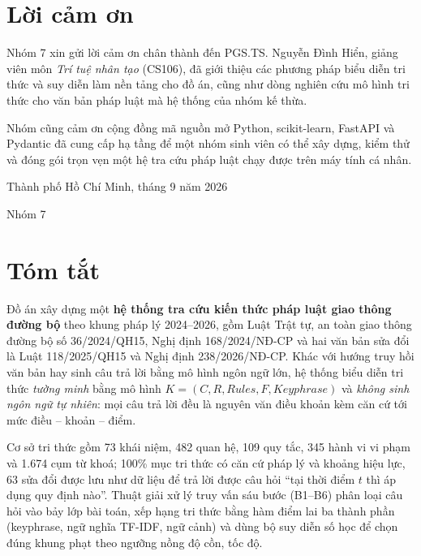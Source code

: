 
\section*{Lời cảm ơn}

Nhóm 7 xin gửi lời cảm ơn chân thành đến PGS.TS. Nguyễn Đình Hiển, giảng viên môn
\emph{Trí tuệ nhân tạo} (CS106), đã giới thiệu các phương pháp biểu diễn tri thức và suy
diễn làm nền tảng cho đồ án, cũng như dòng nghiên cứu mô hình tri thức cho văn bản pháp
luật mà hệ thống của nhóm kế thừa.

Nhóm cũng cảm ơn cộng đồng mã nguồn mở Python, scikit-learn, FastAPI và Pydantic đã cung
cấp hạ tầng để một nhóm sinh viên có thể xây dựng, kiểm thử và đóng gói trọn vẹn một hệ
tra cứu pháp luật chạy được trên máy tính cá nhân.

\vspace{1em}
\hfill Thành phố Hồ Chí Minh, tháng 9 năm 2026

\hfill Nhóm 7

\clearpage
\section*{Tóm tắt}

Đồ án xây dựng một \textbf{hệ thống tra cứu kiến thức pháp luật giao thông đường bộ}
theo khung pháp lý 2024--2026, gồm Luật Trật tự, an toàn giao thông đường bộ số
36/2024/QH15, Nghị định 168/2024/NĐ-CP và hai văn bản sửa đổi là Luật 118/2025/QH15 và
Nghị định 238/2026/NĐ-CP. Khác với hướng truy hồi văn bản hay sinh câu trả lời bằng mô
hình ngôn ngữ lớn, hệ thống biểu diễn tri thức \emph{tường minh} bằng mô hình
$K = (C, R, \mathit{Rules}, F, \mathit{Keyphrase})$ và \emph{không sinh ngôn ngữ tự
nhiên}: mọi câu trả lời đều là nguyên văn điều khoản kèm căn cứ tới mức điều -- khoản --
điểm.

Cơ sở tri thức gồm 73 khái niệm, 482 quan hệ, 109 quy tắc, 345 hành vi vi phạm và 1.674
cụm từ khoá; 100\% mục tri thức có căn cứ pháp lý và khoảng hiệu lực, 63 sửa đổi được lưu
như dữ liệu để trả lời được câu hỏi ``tại thời điểm $t$ thì áp dụng quy định nào''. Thuật
giải xử lý truy vấn sáu bước (B1--B6) phân loại câu hỏi vào bảy lớp bài toán, xếp hạng tri
thức bằng hàm điểm lai ba thành phần (keyphrase, ngữ nghĩa TF-IDF, ngữ cảnh) và dùng bộ
suy diễn số học để chọn đúng khung phạt theo ngưỡng nồng độ cồn, tốc độ.

